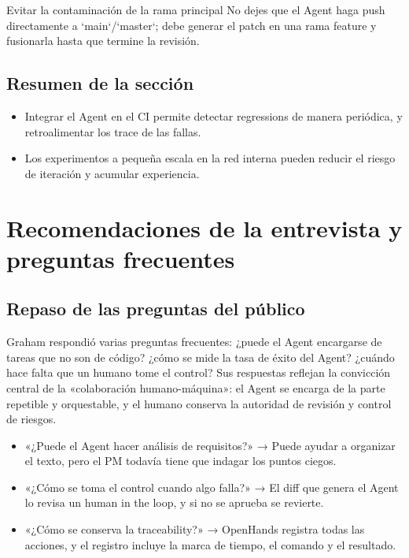 \documentclass[a4paper]{article}
\begin{document}
\begin{warningbox}{Evitar la contaminación de la rama principal}
No dejes que el Agent haga push directamente a `main`/`master`; debe generar el patch en una rama feature y fusionarla hasta que termine la revisión.
\end{warningbox}

\subsection{Resumen de la sección}
\begin{itemize}
    \item Integrar el Agent en el CI permite detectar regressions de manera periódica, y retroalimentar los trace de las fallas.
    \item Los experimentos a pequeña escala en la red interna pueden reducir el riesgo de iteración y acumular experiencia.
\end{itemize}

\section{Recomendaciones de la entrevista y preguntas frecuentes}
\subsection{Repaso de las preguntas del público}
Graham respondió varias preguntas frecuentes: ¿puede el Agent encargarse de tareas que no son de código? ¿cómo se mide la tasa de éxito del Agent? ¿cuándo hace falta que un humano tome el control? Sus respuestas reflejan la convicción central de la «colaboración humano-máquina»: el Agent se encarga de la parte repetible y orquestable, y el humano conserva la autoridad de revisión y control de riesgos.

\begin{itemize}
    \item «¿Puede el Agent hacer análisis de requisitos?» → Puede ayudar a organizar el texto, pero el PM todavía tiene que indagar los puntos ciegos.
    \item «¿Cómo se toma el control cuando algo falla?» → El diff que genera el Agent lo revisa un human in the loop, y si no se aprueba se revierte.
    \item «¿Cómo se conserva la traceability?» → OpenHands registra todas las acciones, y el registro incluye la marca de tiempo, el comando y el resultado.
\end{itemize}
\end{document}
